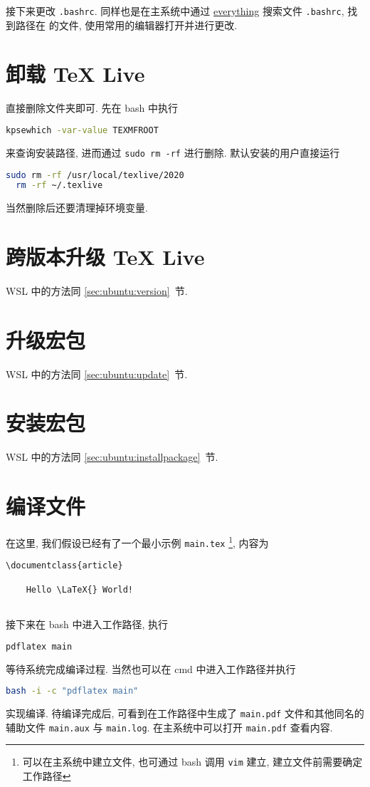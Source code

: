 接下来更改 \texttt{.bashrc}.
同样也是在主系统中通过
\href{https://www.voidtools.com/zh-cn/}{everything}
搜索文件 \texttt{.bashrc},
找到路径在  的文件,
使用常用的编辑器打开并进行更改.

\section{卸载 \TeX{} Live}

直接删除文件夹即可.
先在 \textsf{bash} 中执行
\begin{lstlisting}[language = bash]
  kpsewhich -var-value TEXMFROOT
\end{lstlisting}
来查询安装路径,
进而通过 \texttt{sudo rm -rf} 进行删除.
默认安装的用户直接运行
\begin{lstlisting}[language = bash]
  sudo rm -rf /usr/local/texlive/2020
  rm -rf ~/.texlive
\end{lstlisting}
当然删除后还要清理掉环境变量.

\section{跨版本升级 \TeX{} Live}

WSL 中的方法同 \ref{sec:ubuntu:version}~节.

\section{升级宏包}

WSL 中的方法同 \ref{sec:ubuntu:update}~节.

\section{安装宏包}

WSL 中的方法同 \ref{sec:ubuntu:installpackage}~节.

\section{编译文件}

在这里, 我们假设已经有了一个最小示例 \texttt{main.tex}%
\footnote{可以在主系统中建立文件,
也可通过 \textsf{bash} 调用 \texttt{vim} 建立,
建立文件前需要确定工作路径},
内容为
\begin{lstlisting}[language = {[LaTeX]TeX}]
  \documentclass{article}
  
    Hello \LaTeX{} World!
  
\end{lstlisting}
接下来在 \textsf{bash} 中进入工作路径,
执行
\begin{lstlisting}[language=bash]
  pdflatex main
\end{lstlisting}
等待系统完成编译过程. 
当然也可以在 \textsf{cmd} 中进入工作路径并执行
\begin{lstlisting}[language=bash]
  bash -i -c "pdflatex main"
\end{lstlisting}
实现编译.
待编译完成后, 可看到在工作路径中生成了 \texttt{main.pdf}
文件和其他同名的辅助文件 \texttt{main.aux} 与 \texttt{main.log}.
在主系统中可以打开 \texttt{main.pdf} 查看内容.


